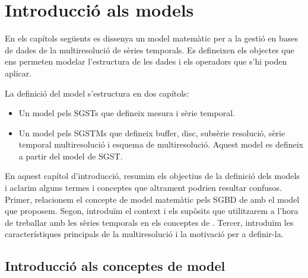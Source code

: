 \chapter{Introducció als models}
\label{sec:model}

En els capítols següents es dissenya un model matemàtic per a la
gestió en bases de dades de la multiresolució de sèries temporals.  Es
defineixen els objectes que ens permeten modelar l'estructura de les
dades i els operadors que s'hi poden aplicar.

La definició del model s'estructura en dos capítols:

\begin{itemize}
\item Un model pels \glspl{SGST}  que defineix mesura i sèrie temporal.
\item Un model pels \glspl{SGSTM} que defineix buffer, disc, subsèrie
  resolució, sèrie temporal multiresolució i esquema de
  multiresolució. Aquest model es defineix a partir del model de \gls{SGST}.
\end{itemize}



  
En aquest capítol d'introducció, resumim els objectius de la definició
dels models i aclarim alguns termes i conceptes que altrament podrien
resultar confusos.  Primer, relacionem el concepte de model matemàtic
pels \gls{SGBD} de  amb el model que
proposem. Segon, introduïm el context i els supòsits que utilitzarem a
l'hora de treballar amb les sèries temporals en els conceptes de
.  Tercer, introduïm les
característiques principals de la multiresolució i la motivació per a
definir-la.


\section{Introducció als conceptes de model}

